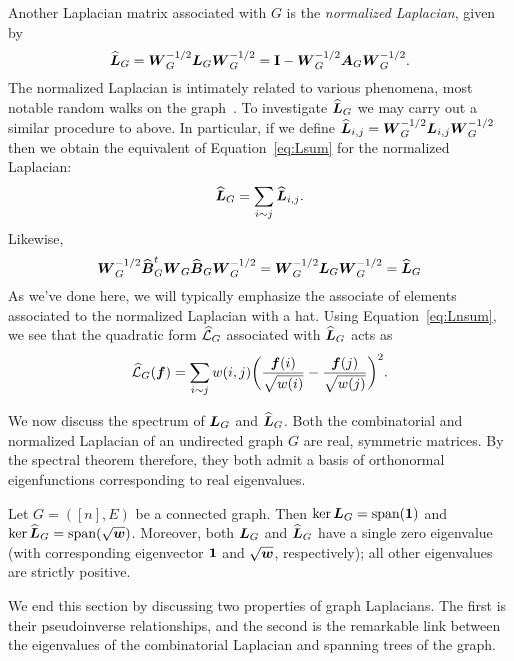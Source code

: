 Another Laplacian matrix associated with $G$ is the \emph{normalized Laplacian}, given by 
\begin{equation}
\label{eq:Ln_G}
    \widehat{\vb*{L}}_G = \vb*{W}_G^{-1/2} \vb*{L}_G\vb*{W}_G^{-1/2} = \vb{I} - \vb*{W}_G^{-1/2} \vb*{A}_G\vb*{W}_{G}^{-1/2}.
\end{equation} 
The normalized Laplacian is intimately related to various  phenomena, most notable random walks on the graph~\cite{chen2007resistance,chung1997spectral}. To investigate $\widehat{\vb*{L}}_G$ we may carry out a similar procedure to above. In particular, if we define $\widehat{\vb*{L}}_{i,j}=\vb*{W}_G^{-1/2} \vb*{L}_{i,j}\vb*{W}_G^{-1/2}$ then we obtain the equivalent of Equation~\eqref{eq:Lsum} for the normalized Laplacian:
\begin{equation}
\label{eq:Lnsum}
    \widehat{\vb*{L}}_G = \sum_{i\sim j}\widehat{\vb*{L}}_{i,j}.
\end{equation}
Likewise, 
\begin{equation*}
   \vb*{W}_G^{-1/2}\widehat{\vb*{B}}_G^t \vb*{W}_G\widehat{\vb*{B}}_G\vb*{W}_G^{-1/2} =  \vb*{W}_G^{-1/2}\vb*{L}_G\vb*{W}_G^{-1/2}=\widehat{\vb*{L}}_G
\end{equation*}
As we've done here, we will typically emphasize the associate of elements associated to the normalized Laplacian with a hat.
Using Equation~\eqref{eq:Lnsum}, we see that 
the quadratic form $\widehat{\mathcal{L}}_G$ associated with $\widehat{\vb*{L}}_G$ acts as 
\begin{equation}
\label{eq:Lnf}
    \widehat{\mathcal{L}}_G(\vb*{f}) = \sum_{i\sim j} w(i,j)\bigg(\frac{\vb*{f}(i)}{\sqrt{w(i)}}-\frac{\vb*{f}(j)}{\sqrt{w(j)}}\bigg)^2.
\end{equation}

We now discuss  the spectrum of $\vb*{L}_G$ and $\widehat{\vb*{L}}_G$. Both the combinatorial and normalized Laplacian of an undirected graph $G$ are real, symmetric matrices. By the spectral theorem therefore, they both admit a basis of orthonormal eigenfunctions corresponding to real eigenvalues. 

\begin{lemma}
	\label{lem:laplacian_props}
	Let $G=([n],E)$ be a connected graph. Then  $\ker\vb*{L}_G=\textnormal{span}(\vb{1})$ and $\ker\widehat{\vb*{L}}_G=\textnormal{span}(\sqrt{\vb*{w}})$. Moreover, both  $\vb*{L}_G$ and $\widehat{\vb*{L}}_G$ have a single zero eigenvalue (with corresponding eigenvector $\vb{1}$ and $\sqrt{\vb*{w}}$, respectively); all other eigenvalues are strictly positive. 
\end{lemma}


We  end this section by discussing two properties of graph Laplacians. The first is  their pseudoinverse relationships, and the second is the remarkable link between the eigenvalues of the combinatorial  Laplacian and spanning trees of the graph. 

